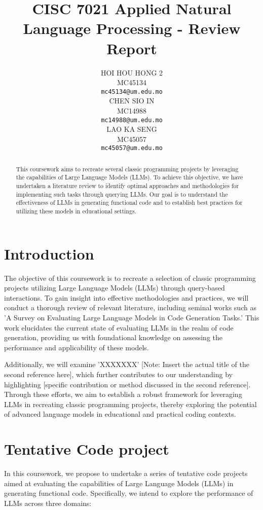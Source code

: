 \documentclass[11pt]{article}
\title{CISC 7021 Applied Natural Language Processing - Review Report}
\author{HOI HOU HONG 2\\
  MC45134 \\
  \texttt{mc45134@um.edu.mo} \\\And
  CHEN SIO IN \\
  MC14988\\
  \texttt{mc14988@um.edu.mo} \\\And
  LAO KA SENG \\
  MC45057 \\
  \texttt{mc45057@um.edu.mo} \\}
\begin{document}
\maketitle
\begin{abstract}
This coursework aims to recreate several classic programming projects by leveraging the capabilities of Large Language Models (LLMs). To achieve this objective, we have undertaken a literature review to identify optimal approaches and methodologies for implementing such tasks through querying LLMs. Our goal is to understand the effectiveness of LLMs in generating functional code and to establish best practices for utilizing these models in educational settings.
\end{abstract}

\section{Introduction}

The objective of this coursework is to recreate a selection of classic programming projects utilizing Large Language Models (LLMs) through query-based interactions. To gain insight into effective methodologies and practices, we will conduct a thorough review of relevant literature, including seminal works such as 'A Survey on Evaluating Large Language Models in Code Generation Tasks.'\cite{chen2024survey} This work elucidates the current state of evaluating LLMs in the realm of code generation, providing us with foundational knowledge on assessing the performance and applicability of these models. 


Additionally, we will examine 'XXXXXXX' [Note: Insert the actual title of the second reference here], which further contributes to our understanding by highlighting [specific contribution or method discussed in the second reference]. Through these efforts, we aim to establish a robust framework for leveraging LLMs in recreating classic programming projects, thereby exploring the potential of advanced language models in educational and practical coding contexts.

\section{Tentative Code project}
In this coursework, we propose to undertake a series of tentative code projects aimed at evaluating the capabilities of Large Language Models (LLMs) in generating functional code. Specifically, we intend to explore the performance of LLMs across three domains: 
\end{document}
